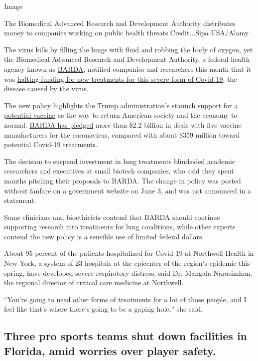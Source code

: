 Image

The Biomedical Advanced Research and Development Authority distributes
money to companies working on public health threats.Credit...Sipa
USA/Alamy

The virus kills by filling the lungs with fluid and robbing the body of
oxygen, yet the Biomedical Advanced Research and Development Authority,
a federal health agency known as
\href{https://medicalcountermeasures.gov/app/barda/coronavirus/COVID19.aspx}{BARDA},
notified companies and researchers this month that it was
\href{https://www.nytimes3xbfgragh.onion/2020/06/19/health/coronavirus-lung-treatment-funding.html}{halting
funding for new treatments for this severe form of Covid-19}, the
disease caused by the virus.

The new policy highlights the Trump administration's staunch support for
\href{https://www.nytimes3xbfgragh.onion/2020/05/15/us/politics/coronavirus-vaccine-timeline.html}{a
potential vaccine} as the way to return American society and the economy
to normal.
\href{https://medicalcountermeasures.gov/app/barda/coronavirus/COVID19.aspx}{BARDA
has pledged} more than \$2.2 billion in deals with five vaccine
manufacturers for the coronavirus, compared with about \$359 million
toward potential Covid-19 treatments.

The decision to suspend investment in lung treatments blindsided
academic researchers and executives at small biotech companies, who said
they spent months pitching their proposals to BARDA. The change in
policy was posted without fanfare on a government website on June 3, and
was not announced in a statement.

Some clinicians and bioethicists contend that BARDA should continue
supporting research into treatments for lung conditions, while other
experts contend the new policy is a sensible use of limited federal
dollars.

About 95 percent of the patients hospitalized for Covid-19 at Northwell
Health in New York, a system of 23 hospitals at the epicenter of the
region's epidemic this spring, have developed severe respiratory
distress, said Dr. Mangala Narasimhan, the regional director of critical
care medicine at Northwell.

``You're going to need other forms of treatments for a lot of those
people, and I feel like that's where there's going to be a gaping
hole,'' she said.

\hypertarget{three-pro-sports-teams-shut-down-facilities-in-florida-amid-worries-over-player-safety}{%
\subsection{Three pro sports teams shut down facilities in Florida, amid
worries over player
safety.}\label{three-pro-sports-teams-shut-down-facilities-in-florida-amid-worries-over-player-safety}}

